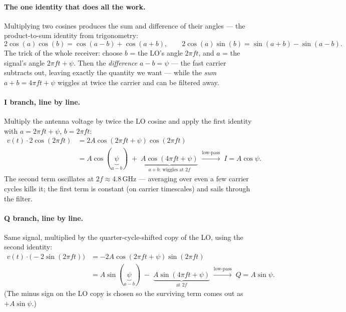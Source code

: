 \paragraph{The one identity that does all the work.}
Multiplying two cosines produces the sum and difference of their angles ---
the product-to-sum identity from trigonometry:
\[
2\cos(a)\cos(b) = \cos(a-b) + \cos(a+b),
\qquad
2\cos(a)\sin(b) = \sin(a+b) - \sin(a-b).
\]
The trick of the whole receiver: choose $b$ = the LO's angle $2\pi f t$, and
$a$ = the signal's angle $2\pi f t + \psi$. Then the \emph{difference}
$a - b = \psi$ --- the fast carrier subtracts out, leaving exactly the
quantity we want --- while the \emph{sum} $a + b = 4\pi f t + \psi$ wiggles at
twice the carrier and can be filtered away.

\paragraph{I branch, line by line.}
Multiply the antenna voltage by twice the LO cosine and apply the first
identity with $a = 2\pi f t + \psi$, $b = 2\pi f t$:
\begin{align*}
v(t)\cdot 2\cos(2\pi f t)
  &= 2A\cos(2\pi f t + \psi)\cos(2\pi f t)\\
  &= A\cos(\underbrace{\psi}_{a-b})
     \;+\; \underbrace{A\cos(4\pi f t + \psi)}_{a+b:\ \text{wiggles at }2f}
  \;\xrightarrow{\text{low-pass}}\; I = A\cos\psi .
\end{align*}
The second term oscillates at $2f \approx 4.8$\,GHz --- averaging over even a
few carrier cycles kills it; the first term is constant (on carrier
timescales) and sails through the filter.

\paragraph{Q branch, line by line.}
Same signal, multiplied by the quarter-cycle-shifted copy of the LO, using
the second identity:
\begin{align*}
v(t)\cdot \big(-2\sin(2\pi f t)\big)
  &= -2A\cos(2\pi f t + \psi)\sin(2\pi f t)\\
  &= A\sin(\underbrace{\psi}_{a-b})
     \;-\; \underbrace{A\sin(4\pi f t + \psi)}_{\text{at }2f}
  \;\xrightarrow{\text{low-pass}}\; Q = A\sin\psi .
\end{align*}
(The minus sign on the LO copy is chosen so the surviving term comes out as
$+A\sin\psi$.)

